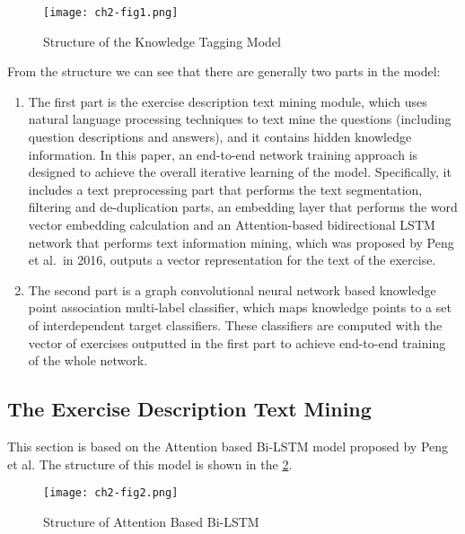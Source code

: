 \begin{figure}[htbp!]
	\centering
	\texttt{[image: ch2-fig1.png]}
	\caption{Structure of the Knowledge Tagging Model}\label{ch2-fig1}
\end{figure}




From the structure we can see that there are generally two parts in the model:
\begin{enumerate}
	\item The first part is the exercise description text mining module, which uses natural language processing techniques to text mine the questions (including question descriptions and answers), and it contains hidden knowledge information. In this paper, an end-to-end network training approach is designed to achieve the overall iterative learning of the model. Specifically, it includes a text preprocessing part that performs the text segmentation, filtering and de-duplication parts, an embedding layer that performs the word vector embedding calculation and an Attention-based bidirectional LSTM network that performs text information mining, which was proposed by Peng et al.\ in 2016\cite{zhou2016attention}, outputs a vector representation for the text of the exercise.
	\item The second part is a graph convolutional neural network based knowledge point association multi-label classifier, which maps knowledge points to a set of interdependent target classifiers. These classifiers are computed with the vector of exercises outputted in the first part to achieve end-to-end training of the whole network.
\end{enumerate}


\subsection{The Exercise Description Text Mining}
This section is based on the Attention based Bi-LSTM model proposed by Peng et al. The structure of this model is shown in the \figurename{\ref{ch2-fig2}}.
\begin{figure}[htbp!]
	\centering
	\texttt{[image: ch2-fig2.png]}
	\caption{Structure of Attention Based Bi-LSTM}\label{ch2-fig2}
\end{figure}

